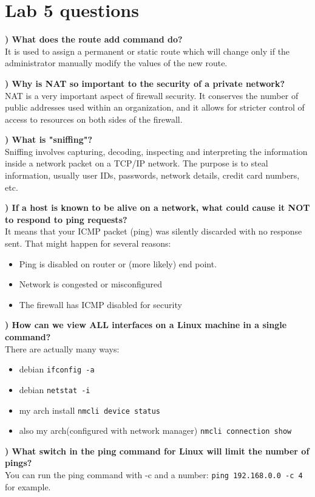 \documentclass{report}
\title{\classinfo}
\author{\semester}
\date{\today}
\newcommand{\mysection}[1]{\section*{#1}}
\newcommand{\mysubsection}[2]{\textbf{\romannumeral #1) #2}}
\begin{document}
\maketitle

\mysection{\textbf{Lab 5 questions}}

 
\mysubsection{1}{What does the route add command do?}
\\It is used to assign a permanent or static route which will change only if the administrator manually modify the values of the new route.
\hfill\break

\noindent\mysubsection{2}{Why is NAT so important to the security of a private network?}
\\NAT is a very important aspect of firewall security. It conserves the number of public addresses used within an organization, and it allows for stricter control of access to resources on both sides of the firewall.
\hfill\break

\noindent\mysubsection{3}{What is "sniffing"?}
\\Sniffing involves capturing, decoding, inspecting and interpreting the information inside a network packet on a TCP/IP network. The purpose is to steal information, usually user IDs, passwords, network details, credit card numbers, etc.
\hfill\break

\noindent\mysubsection{4}{If a host is known to be alive on a network, what could cause it NOT to respond to ping requests?}
\\It means that your ICMP packet (ping) was silently discarded with no response sent. That might happen for several reasons:

\begin{itemize}
  \item{Ping is disabled on router or (more likely) end point.} 
  \item{Network is congested or misconfigured} 
  \item{The firewall has ICMP disabled for security} 
\end{itemize}
\hfill\break

\noindent\mysubsection{5}{How can we view ALL interfaces on a Linux machine in a single command?}
\\There are actually many ways:
\begin{itemize}
  \item{debian} {\scriptsize{\verb$ifconfig -a$}\normalsize}  
  \item{debian} {\scriptsize{\verb$netstat -i$}\normalsize} 
  \item{my arch install} {\scriptsize{\verb$nmcli device status$}\normalsize} 
  \item{also my arch(configured with network manager)} {\scriptsize{\verb$nmcli connection show$}\normalsize} 
\end{itemize}

\hfill\break

\noindent\mysubsection{6}{What switch in the ping command for Linux will limit the number of pings?}
\\You can run the ping command with -c and a number:
{\scriptsize{\verb$ping 192.168.0.0 -c 4$}\normalsize} for example. 



\end{document}
